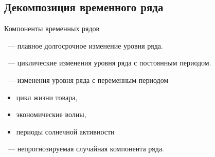 \documentclass[10pt,pdf,utf8,hyperref={unicode},aspectratio=169]{beamer}
\begin{document}
\subsection{Декомпозиция временного ряда}
\begin{frame}{Компоненты временных рядов}
	\begin{description}
		\item[\textbf{Тренд} $u_t$]~--- плавное долгосрочное изменение уровня ряда.
		
		\item[\textbf{Сезонность} $s_t$]~--- циклические изменения уровня ряда с постоянным периодом.
		
		\item[\textbf{Цикличность} $v_t$]~--- изменения уровня ряда с переменным периодом 
		\begin{itemize}
			\item цикл жизни товара, 
			\item экономические волны,
			\item периоды солнечной активности
		\end{itemize}		
		\item[\textbf{Остатки} $\varepsilon_t$]~--- непрогнозируемая случайная компонента ряда.
	\end{description}


\end{frame}
\end{document}
